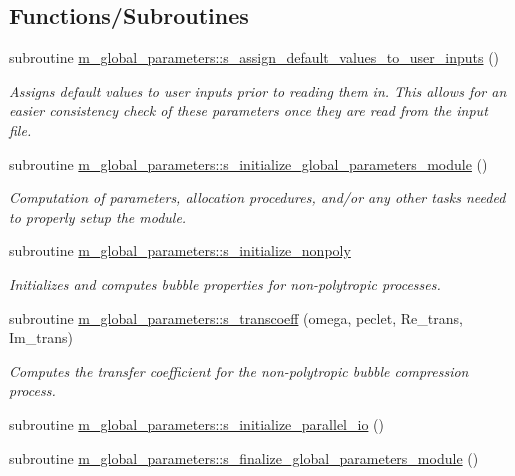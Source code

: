 \subsection*{Functions/\+Subroutines}
\begin{DoxyCompactItemize}
\item 
subroutine \hyperlink{namespacem__global__parameters_a433eac37597eb46a3cac84ca0471f5d3}{m\+\_\+global\+\_\+parameters\+::s\+\_\+assign\+\_\+default\+\_\+values\+\_\+to\+\_\+user\+\_\+inputs} ()
\begin{DoxyCompactList}\small\item\em Assigns default values to user inputs prior to reading them in. This allows for an easier consistency check of these parameters once they are read from the input file. \end{DoxyCompactList}\item 
subroutine \hyperlink{namespacem__global__parameters_a8a76198d180cb9736c21dde108cb0dbf}{m\+\_\+global\+\_\+parameters\+::s\+\_\+initialize\+\_\+global\+\_\+parameters\+\_\+module} ()
\begin{DoxyCompactList}\small\item\em Computation of parameters, allocation procedures, and/or any other tasks needed to properly setup the module. \end{DoxyCompactList}\item 
subroutine \hyperlink{namespacem__global__parameters_a1611e2cf82243c04b04a11281ef67993}{m\+\_\+global\+\_\+parameters\+::s\+\_\+initialize\+\_\+nonpoly}
\begin{DoxyCompactList}\small\item\em Initializes and computes bubble properties for non-\/polytropic processes. \end{DoxyCompactList}\item 
subroutine \hyperlink{namespacem__global__parameters_af52b102f1c17e28aa4ca3070f8806ca6}{m\+\_\+global\+\_\+parameters\+::s\+\_\+transcoeff} (omega, peclet, Re\+\_\+trans, Im\+\_\+trans)
\begin{DoxyCompactList}\small\item\em Computes the transfer coefficient for the non-\/polytropic bubble compression process. \end{DoxyCompactList}\item 
subroutine \hyperlink{namespacem__global__parameters_a54905a7a2ce9e15fc33ebac52c0d3c27}{m\+\_\+global\+\_\+parameters\+::s\+\_\+initialize\+\_\+parallel\+\_\+io} ()
\item 
subroutine \hyperlink{namespacem__global__parameters_aa2237c2ed3662bbd69ef39e2e92af7bf}{m\+\_\+global\+\_\+parameters\+::s\+\_\+finalize\+\_\+global\+\_\+parameters\+\_\+module} ()

\end{DoxyCompactItemize}
